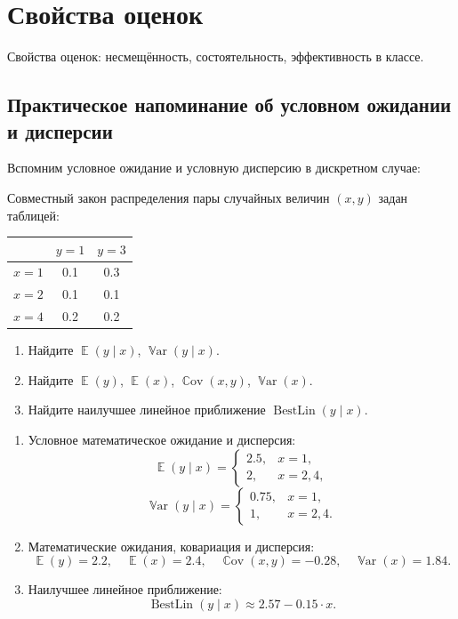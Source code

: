 \documentclass[12pt]{article}
\DeclareMathOperator{\Cov}{\mathbb{C}ov}
\DeclareMathOperator{\Var}{\mathbb{V}ar}
\DeclareMathOperator{\BestLin}{BestLin}
\DeclareMathOperator{\E}{\mathbb{E}}
\begin{document}
\section{Свойства оценок}
Свойства оценок: несмещённость, состоятельность, эффективность в классе.

\subsection{Практическое напоминание об условном ожидании и дисперсии}

Вспомним условное ожидание и условную дисперсию в дискретном случае:
\begin{problem}
Совместный закон распределения пары случайных величин $(x, y)$ задан таблицей:

\begin{tabular}{ccc}
\toprule
     & $y = 1$ & $y = 3$ \\
\midrule
$x = 1$ & 0.1 & 0.3 \\
$x = 2$ & 0.1 & 0.1 \\
$x = 4$ & 0.2 & 0.2 \\
\bottomrule
\end{tabular}

\begin{enumerate}
    \item Найдите $\E(y \mid x)$, $\Var(y \mid x)$.
    \item Найдите $\E(y)$, $\E(x)$, $\Cov(x, y)$, $\Var(x)$.
    \item Найдите наилучшее линейное приближение $\BestLin(y \mid x)$.
\end{enumerate}

    \begin{sol}
    \begin{enumerate}
    \item Условное математическое ожидание и дисперсия:
   \[
   \E(y \mid x) = \begin{cases}
   2.5, & x = 1, \\
   2, & x = 2, 4,
   \end{cases}
   \]
   \[
   \Var(y \mid x) = \begin{cases}
   0.75, & x = 1, \\
   1, & x = 2, 4.
   \end{cases}
   \]
    \item Математические ожидания, ковариация и дисперсия:
   \[
   \E(y) = 2.2, \quad \E(x) = 2.4, \quad \Cov(x, y) = -0.28, \quad \Var(x) = 1.84.
   \]
    \item Наилучшее линейное приближение:
   \[
   \BestLin(y \mid x) \approx 2.57 - 0.15 \cdot x.
   \]
   \end{enumerate}
    \end{sol}
\end{problem}
\end{document}
